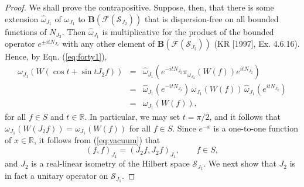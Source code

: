 \documentclass[12pt]{article}
\theoremstyle{remark}
\theoremstyle{definition}
\newcommand{\hil}[1]{\mathcal{#1}}
\begin{document}
\begin{proof} We shall prove the contrapositive.  Suppose, then, that
  there is some extension $\hat{\omega}_{J_{1}}$ of $\omega _{J_{1}}$ to
  $\mathbf{B}(\hil{F}(\hil{S}_{J_{2}}))$ that is dispersion-free on all bounded
  functions of $N_{J_{2}}$.  Then $\hat{\omega }_{J_{1}}$ is multiplicative
  for the product of the bounded operator $e^{\pm itN_{J_{2}}}$ with any other element of
  $\mathbf{B}(\hil{F}(\hil{S}_{J_{2}}))$ (KR [1997], Ex. 4.6.16).  Hence, 
  by Eqn. (\ref{eq:forty1}),
\begin{eqnarray} \omega _{J_{1}}(W(\cos t +\sin t J_{2}f)) &=& \hat{\omega
      }_{J_{1}} \left( e^{-itN_{J_{2}}}\pi_{\omega _{J_{2}}}(W(f))e^{itN_{J_{2}}} \right) \\
    &=&\hat{\omega}_{J_{1}}(e^{-itN_{J_{2}}})\,\omega _{J_{1}}(W(f))
    \,\hat{\omega}_{J_{1}}(e^{itN_{J_{2}}}) \\
    &=&\omega _{J_{1}}(W(f)), \end{eqnarray} 
for all $f\in S$ and $t\in \mathbb{R}$.  In particular, we may set 
$t=\pi /2$, and it follows that $\omega _{J_{1}}(W(J_{2}f))=\omega _{J_{1}}(W(f))$ 
for all $f\in S$.  Since $e^{-x}$ is a one-to-one function of
    $x\in \mathbb{R}$, it follows from (\ref{eq:vacuum}) that 
\begin{equation}
(f,f)_{J_{1}}=(J_{2}f,J_{2}f)_{J_{1}} , \qquad f\in S , \end{equation}
and $J_{2}$ is a real-linear isometry of the Hilbert space 
$\hil{S}_{J_{1}}$.  We next show that $J_{2}$ is in fact a unitary 
operator on $\hil{S}_{J_{1}}$.


\end{proof}
\end{document}
